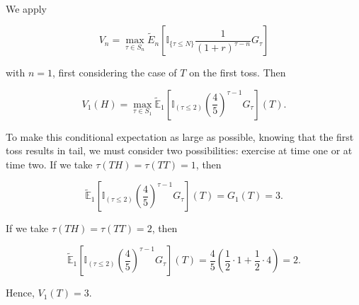 \documentclass[c, dvipsnames, 8pt]{beamer}
\begin{document}
\begin{frame}[shrink=5]

\frametitle{\insertsection} 
\framesubtitle{\insertsubsection} 

\

We apply

\begin{equation}\label{e1}
V_n = \max_{\tau \in S_n} \tilde{E}_n [\mathbb{I}_{\{\tau \leq N\}} \dfrac{1}{(1+r)^{\tau-n}}G_{\tau}]
\end{equation}


with $n=1$, first considering the case of $T$ on the first toss. Then 

\begin{equation}\label{key}
V_1(H)=\max\limits_{{\tau \in S_1}}\widetilde{\mathbb{E}}_1\left [ \mathbb{I}_{(\tau\leq 2)}\left ( \frac{4}{5} \right )^{\tau-1}G_\tau \right ](T).
\end{equation}

To make this conditional expectation as large as possible, knowing that the first toss results in tail, we must consider two possibilities: exercise at time one or at time two. If we take $\tau(TH)= \tau(TT)= 1$, then

\begin{equation}\label{key}
\widetilde{\mathbb{E}}_1\left [ \mathbb{I}_{(\tau\leq 2)} \left ( \frac{4}{5} \right )^{\tau-1}G_\tau  \right ](T) = G_1(T) = 3.
\end{equation}

If we take $\tau(TH)= \tau(TT)= 2$, then

\begin{equation}\label{key}
\widetilde{\mathbb{E}}_1\left [ \mathbb{I}_{(\tau\leq 2)} \left ( \frac{4}{5} \right )^{\tau-1}G_\tau  \right ](T) = \frac{4}{5}\left ( \frac{1}{2}\cdot 1 + \frac{1}{2}\cdot 4\right ) = 2.
\end{equation}

Hence, $V_1(T) = 3$.

\end{frame}
\end{document}

